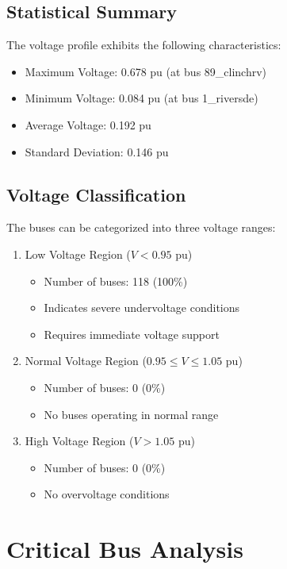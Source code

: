 \documentclass[11pt]{article}
\begin{document}
\subsection{Statistical Summary}
The voltage profile exhibits the following characteristics:
\begin{itemize}
    \item Maximum Voltage: 0.678 pu (at bus 89\_clinchrv)
    \item Minimum Voltage: 0.084 pu (at bus 1\_riversde)
    \item Average Voltage: 0.192 pu
    \item Standard Deviation: 0.146 pu
\end{itemize}

\subsection{Voltage Classification}
The buses can be categorized into three voltage ranges:
\begin{enumerate}
    \item Low Voltage Region ($V < 0.95$ pu)
    \begin{itemize}
        \item Number of buses: 118 (100\%)
        \item Indicates severe undervoltage conditions
        \item Requires immediate voltage support
    \end{itemize}
    
    \item Normal Voltage Region ($0.95 \leq V \leq 1.05$ pu)
    \begin{itemize}
        \item Number of buses: 0 (0\%)
        \item No buses operating in normal range
    \end{itemize}
    
    \item High Voltage Region ($V > 1.05$ pu)
    \begin{itemize}
        \item Number of buses: 0 (0\%)
        \item No overvoltage conditions
    \end{itemize}
\end{enumerate}

\section{Critical Bus Analysis}
\end{document}
